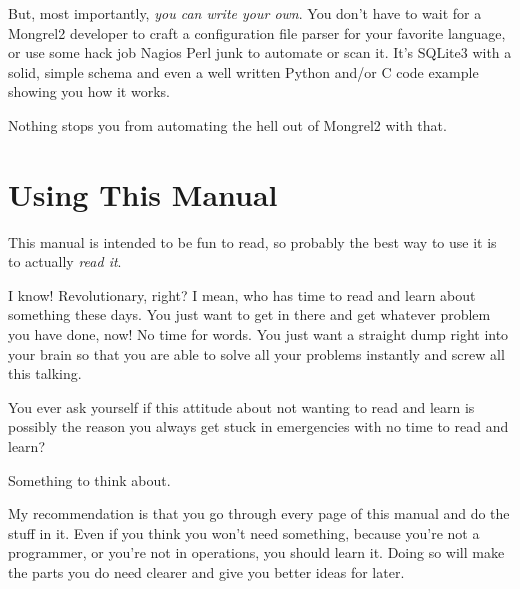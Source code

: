 But, most importantly, \emph{you can write your own}.  You don't have to wait
for a Mongrel2 developer to craft a configuration file parser for your favorite
language, or use some hack job Nagios Perl junk to automate or scan it.  It's
SQLite3 with a solid, simple schema and even a well written Python and/or C
code example showing you how it works.

Nothing stops you from automating the hell out of Mongrel2 with that.


\section{Using This Manual}

This manual is intended to be fun to read, so probably the best way to use it
is to actually \emph{read it}.

I know! Revolutionary, right?  I mean, who has time to read and learn about something
these days.  You just want to get in there and get whatever problem you have done,
now! No time for words.  You just want a straight dump right into your brain so
that you are able to solve all your problems instantly and screw all this talking.

You ever ask yourself if this attitude about not wanting to read and learn is
possibly the reason you always get stuck in emergencies with no time to read
and learn?

Something to think about.

My recommendation is that you go through every page of this manual and do the
stuff in it.  Even if you think you won't need something, because you're not
a programmer, or you're not in operations, you should learn it.  Doing so will
make the parts you do need clearer and give you better ideas for later.


